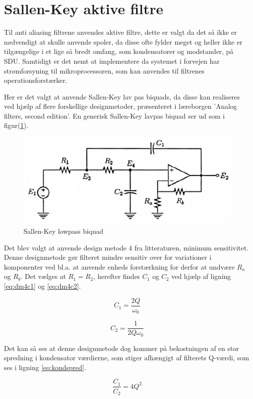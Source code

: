\section{Sallen-Key aktive filtre}

Til anti aliasing filtrene anvendes aktive filtre, dette er valgt da det så ikke er
nødvendigt at skulle anvende spoler, da disse ofte fylder meget og heller ikke er
tilgængelige i et lige så bredt omfang, som kondensatorer og modstander, på SDU.
Samtidigt er det nemt at implementere da systemet i forvejen har strømforsyning til
mikroprocessoren, som kan anvendes til filtrenes operationsforstærker.

Her er det valgt at anvende Sallen-Key lav pas biquads,
da disse kan realiseres ved hjælp af flere forskellige designmetoder, præsenteret 
i læreborgen 'Analog filters, second edition'\cite{KendallSu}.
En generisk Sallen-Key lavpas biquad ser ud som i figur(\ref{fig:sklpbq}).

\begin{figure}[H]
	\centering
	\includegraphics[width=\textwidth]{billeder/sklpbq}
	\caption{Sallen-Key lowpass biquad \cite{KendallSu}}
	\label{fig:sklpbq}
\end{figure}

Det blev valgt at anvende design metode 4 fra litteraturen, minimum sensitivitet.
Denne designmetode gør filteret mindre sensitiv over for variationer i komponenter ved bl.a.
at anvende enheds forstærkning for derfor at undvære $R_a$ og $R_b$.
Det vælges at $R_1 = R_2$, herefter findes $C_1$ og $C_2$ ved hjælp af ligning \ref{eq:dm4c1} og \ref{eq:dm4c2}.

\vspace{15pt}

\begin{minipage}{0.5\linewidth}
	\begin{equation}
	\label{eq:dm4c1}
		C_1 = \frac{2Q}{\omega_0}
	\end{equation}
\end{minipage}
\begin{minipage}{0.5\linewidth}
	\begin{equation}
	\label{eq:dm4c2}
	C_2 = \frac{1}{2Q\omega_0}
	\end{equation}
\end{minipage}

\vspace{15pt}

Det kan så ses at denne designmetode dog kommer på bekostningen af en stor spredning i kondensator værdierne, som stiger afhængigt af filterets Q-værdi, som ses i ligning \ref{eq:kondspred}.

\begin{equation}
\label{eq:kondspred}
	\frac{C_1}{C_2} = 4Q^2
\end{equation}



